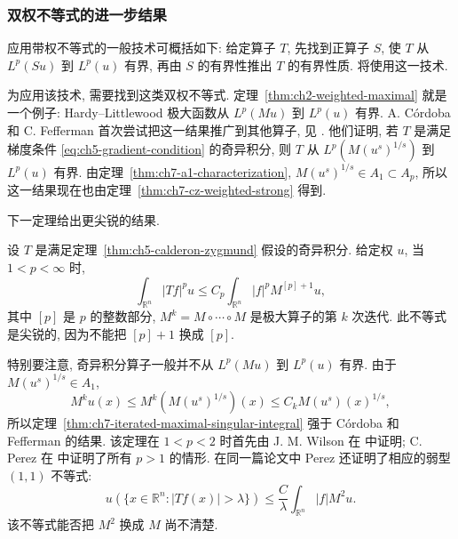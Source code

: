 \subsubsection{双权不等式的进一步结果}
\label{subsec:ch7-more-two-weights}

应用带权不等式的一般技术可概括如下: 给定算子 $T$, 先找到正算子 $S$, 使 $T$ 从 $L^p(Su)$ 到 $L^p(u)$ 有界, 再由 $S$ 的有界性推出 $T$ 的有界性质. 将使用这一技术.

\hypertarget{chapter-07-page-168}{}
为应用该技术, 需要找到这类双权不等式. 定理~\ref{thm:ch2-weighted-maximal} 就是一个例子: Hardy--Littlewood 极大函数从 $L^p(Mu)$ 到 $L^p(u)$ 有界. A. Córdoba 和 C. Fefferman 首次尝试把这一结果推广到其他算子, 见 . 他们证明, 若 $T$ 是满足梯度条件 \eqref{eq:ch5-gradient-condition} 的奇异积分, 则 $T$ 从 $L^p(M(u^s)^{1/s})$ 到 $L^p(u)$ 有界. 由定理~\ref{thm:ch7-a1-characterization}, $M(u^s)^{1/s}\in A_1\subset A_p$, 所以这一结果现在也由定理~\ref{thm:ch7-cz-weighted-strong} 得到.

下一定理给出更尖锐的结果.

\begin{Theorem}
\label{thm:ch7-iterated-maximal-singular-integral}
设 $T$ 是满足定理~\ref{thm:ch5-calderon-zygmund} 假设的奇异积分. 给定权 $u$, 当 $1<p<\infty$ 时,
\[
 \int_{\mathbb R^n}|Tf|^pu
 \le C_p\int_{\mathbb R^n}|f|^pM^{[p]+1}u,
\]
其中 $[p]$ 是 $p$ 的整数部分, $M^k=M\circ\cdots\circ M$ 是极大算子的第 $k$ 次迭代. 此不等式是尖锐的, 因为不能把 $[p]+1$ 换成 $[p]$.
\end{Theorem}

特别要注意, 奇异积分算子一般并不从 $L^p(Mu)$ 到 $L^p(u)$ 有界. 由于 $M(u^s)^{1/s}\in A_1$,
\[
 M^ku(x)\le M^k(M(u^s)^{1/s})(x)
 \le C_kM(u^s)(x)^{1/s},
\]
所以定理~\ref{thm:ch7-iterated-maximal-singular-integral} 强于 Córdoba 和 Fefferman 的结果. 该定理在 $1<p<2$ 时首先由 J. M. Wilson 在  中证明; C. Perez 在  中证明了所有 $p>1$ 的情形. 在同一篇论文中 Perez 还证明了相应的弱型 $(1,1)$ 不等式:
\[
 u(\{x\in\mathbb R^n:|Tf(x)|>\lambda\})
 \le\frac C\lambda\int_{\mathbb R^n}|f|M^2u.
\]
该不等式能否把 $M^2$ 换成 $M$ 尚不清楚.

